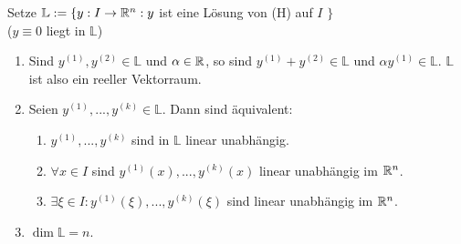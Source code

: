 \documentclass[a4paper,oneside,DIV15,BCOR12mm,chapterprefix=true,headings=onelinechapter]{scrbook}
\begin{document}
\begin{definition}
Setze $\mathbb{L} := \{ y: I\to \mathbb{R}^n : y $ ist eine Lösung von (H) auf $I$ $\}$\\
($y \equiv 0$ liegt in $\mathbb{L}$)
\end{definition}

\begin{satz}
\begin{enumerate}
\item Sind $y^{(1)}, y^{(2)} \in \mathbb{L}$ und $\alpha \in \mathbb{R}$, so  
sind $y^{(1)} + y^{(2)} \in \mathbb{L}$ und $\alpha y^{(1)} \in \mathbb 
{L}$. $\mathbb{L}$ ist also ein reeller Vektorraum.

\item Seien $y^{(1)}, ..., y^{(k)} \in \mathbb{L}$. Dann sind  
äquivalent:
 \begin{enumerate}
  \item $y^{(1)}, ... , y^{(k)}$ sind in $\mathbb{L}$ linear unabhängig.
  \item $\forall x \in I$ sind $y^{(1)}(x), ..., y^{(k)}(x)$ linear  
unabhängig im $\mathbb{R}^n$.
  \item $\exists \xi \in I: y^{(1)}(\xi ), ..., y^{(k)}(\xi ) 
$ sind linear unabhängig im $\mathbb{R}^n$.
 \end{enumerate}

\item $\dim \mathbb{L} = n$.
\end{enumerate}
\end{satz}
\end{document}
